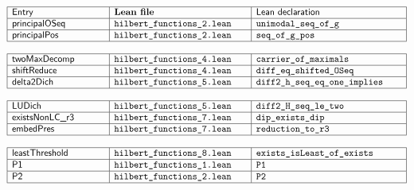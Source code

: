 \documentclass[11pt,reqno]{amsart}
\begin{document}
\begin{center}
$%
\begin{array}{|m{3.5cm}|m{5cm}|m{5.5cm}|}
\hline
\text{\textsf{Entry}} & \text{\textbf{Lean file}} & \text{\textsf{Lean
declaration}} \\ \hline
\text{\textsf{principalOSeq}} & \text{\texttt{hilbert\_functions\_2.lean}} & 
\text{\texttt{unimodal\_seq\_of\_g}} \\ \hline
\text{\textsf{principalPos}} & \text{\texttt{hilbert\_functions\_2.lean}} & 
\text{\texttt{seq\_of\_g\_pos}} \\ \hline
\end{array}%
$

$%
\begin{array}{|m{3.5cm}|m{5cm}|m{5.5cm}|}
\hline
\text{\textsf{twoMaxDecomp}} & \text{\texttt{hilbert\_functions\_4.lean}} & 
\text{\texttt{carrier\_of\_maximals}} \\ \hline
\text{\textsf{shiftReduce}} & \text{\texttt{hilbert\_functions\_4.lean}} & 
\text{\texttt{diff\_eq\_shifted\_OSeq}} \\ \hline
\text{\textsf{delta2Dich}} & \text{\texttt{hilbert\_functions\_5.lean}} & 
\text{\texttt{diff2\_h\_seq\_eq\_one\_implies}} \\ \hline
\end{array}%
$

$%
\begin{array}{|m{3.5cm}|m{5cm}|m{5.5cm}|}
\hline
\text{\textsf{LUDich}} & \text{\texttt{hilbert\_functions\_5.lean}} & \text{%
\texttt{diff2\_H\_seq\_le\_two}} \\ \hline
\text{\textsf{existsNonLC\_r3}} & \text{\texttt{hilbert\_functions\_7.lean}}
& \text{\texttt{dip\_exists\_dip}} \\ \hline
\text{\textsf{embedPres}} & \text{\texttt{hilbert\_functions\_7.lean}} & 
\text{\texttt{reduction\_to\_r3}} \\ \hline
\end{array}%
$

$%
\begin{array}{|m{3.5cm}|m{5cm}|m{5.5cm}|}
\hline
\text{\textsf{leastThreshold}} & \text{\texttt{hilbert\_functions\_8.lean}}
& \text{\texttt{exists\_isLeast\_of\_exists}} \\ \hline
\text{\textsf{P1}} & \text{\texttt{hilbert\_functions\_1.lean}} & \text{%
\texttt{P1}} \\ \hline
\text{\textsf{P2}} & \text{\texttt{hilbert\_functions\_2.lean}} & \text{%
\texttt{P2}} \\ \hline
\end{array}%
$


\end{center}
\end{document}
